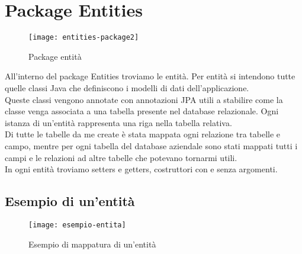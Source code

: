 \section{Package Entities}

\begin{figure}[H] 
    \centering 
    \texttt{[image: entities-package2]} 
    \caption{Package entità}
\end{figure}

\noindent All'interno del package Entities troviamo le entità. Per entità si intendono tutte quelle classi Java che definiscono i modelli di dati dell'applicazione.\\
Queste classi vengono annotate con annotazioni JPA utili a stabilire come la classe venga associata a una tabella presente nel database relazionale. Ogni istanza di un'entità rappresenta una riga nella tabella relativa.\\
Di tutte le tabelle da me create è stata mappata ogni relazione tra tabelle e campo, mentre per ogni tabella del database aziendale sono stati mappati tutti i campi e le relazioni ad altre tabelle che potevano tornarmi utili.\\
In ogni entità troviamo setters e getters, costruttori con e senza argomenti.\\

\subsection{Esempio di un'entità}
\begin{figure}[H] 
    \centering 
    \texttt{[image: esempio-entita]} 
    \caption{Esempio di mappatura di un'entità}
\end{figure}

